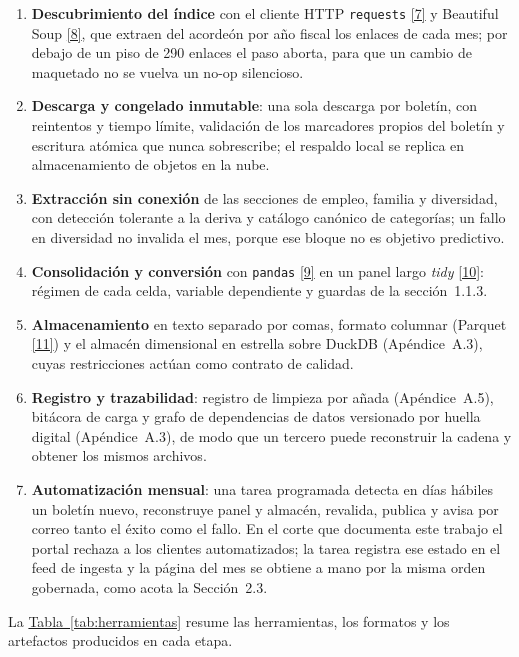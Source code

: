 \documentclass[12pt,letterpaper]{report}
\newcommand{\cita}[1]{\hyperref[bib:#1]{[#1]}}
\begin{document}
\begin{enumerate}[leftmargin=*, itemsep=1pt, topsep=2pt]
\item \textbf{Descubrimiento del índice} con el cliente HTTP \texttt{requests} \cita{7} y Beautiful
Soup \cita{8}, que extraen del acordeón por año fiscal los enlaces de cada mes; por debajo de un piso
de 290 enlaces el paso aborta, para que un cambio de maquetado no se vuelva un no-op silencioso.
\item \textbf{Descarga y congelado inmutable}: una sola descarga por boletín, con reintentos y tiempo
límite, validación de los marcadores propios del boletín y escritura atómica que nunca sobrescribe;
el respaldo local se replica en almacenamiento de objetos en la nube.
\item \textbf{Extracción sin conexión} de las secciones de empleo, familia y diversidad, con
detección tolerante a la deriva y catálogo canónico de categorías; un fallo en diversidad no
invalida el mes, porque ese bloque no es objetivo predictivo.
\item \textbf{Consolidación y conversión} con \texttt{pandas} \cita{9} en un panel largo
\textit{tidy} \cita{10}: régimen de cada celda, variable dependiente y guardas de la sección~1.1.3.
\item \textbf{Almacenamiento} en texto separado por comas, formato columnar (Parquet \cita{11}) y el
almacén dimensional en estrella sobre DuckDB (Apéndice~A.3), cuyas restricciones actúan como
contrato de calidad.
\item \textbf{Registro y trazabilidad}: registro de limpieza por añada (Apéndice~A.5), bitácora de
carga y grafo de dependencias de datos versionado por huella digital (Apéndice~A.3), de modo que un
tercero puede reconstruir la cadena y obtener los mismos archivos.
\item \textbf{Automatización mensual}: una tarea programada detecta en días hábiles un boletín nuevo,
reconstruye panel y almacén, revalida, publica y avisa por correo tanto el éxito como el fallo. En el
corte que documenta este trabajo el portal rechaza a los clientes automatizados; la tarea registra
ese estado en el feed de ingesta y la página del mes se obtiene a mano por la misma orden gobernada,
como acota la Sección~2.3.
\end{enumerate}

La \hyperref[tab:herramientas]{Tabla~\ref*{tab:herramientas}} resume las herramientas, los formatos y los artefactos
producidos en cada etapa.
\end{document}
